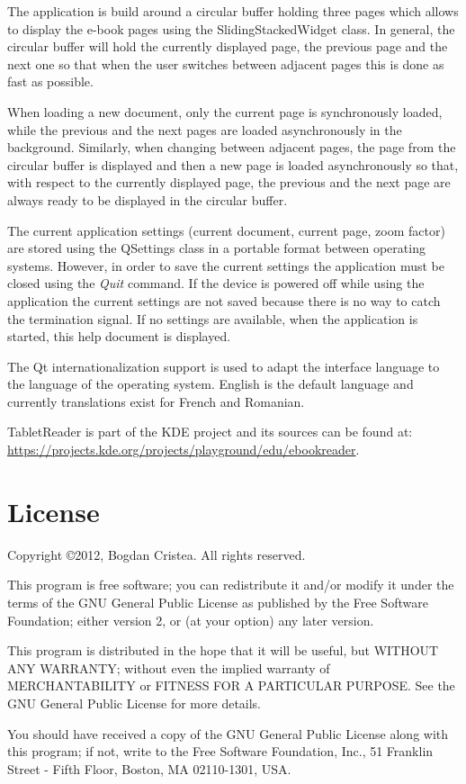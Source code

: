 \documentclass[journal,12pt]{IEEEtran}
\begin{document}
The application is build around a circular buffer holding three pages which allows to display the e-book pages using the \textrm{SlidingStackedWidget} class. In general, the circular buffer will hold the currently displayed page, the previous page and the next one so that when the user switches between adjacent pages this is done as fast as possible. 

When loading a new document, only the current page is synchronously loaded, while the previous and the next pages are loaded asynchronously in the background. Similarly, when changing between adjacent pages, the page from the circular buffer is displayed and then a new page is loaded asynchronously so that, with respect to the currently displayed page, the previous and the next page are always ready to be displayed in the circular buffer.

The current application settings (current document, current page, zoom factor) are stored using the \textrm{QSettings} class in a portable format between operating systems. However, in order to save the current settings the application must be closed using the \textit{Quit} command. If the device is powered off while using the application the current settings are not saved because there is no way to catch the termination signal. If no settings are available, when the application is started, this help document is displayed.

The Qt internationalization support is used to adapt the interface language to the language of the operating system. English is the default language and currently translations exist for French and Romanian.

TabletReader is part of the KDE project and its sources can be found at: \url{https://projects.kde.org/projects/playground/edu/ebookreader}.

\section{License}
 Copyright \copyright 2012, Bogdan Cristea. All rights reserved.
 
 This program is free software; you can redistribute it and/or modify  it under the terms of the GNU General Public License as published by  the Free Software Foundation; either version 2, or (at your option)  any later version.
 
 This program is distributed in the hope that it will be useful,  but WITHOUT ANY WARRANTY; without even the implied warranty of
 MERCHANTABILITY or FITNESS FOR A PARTICULAR PURPOSE.  See the  GNU General Public License for more details.
 
 You should have received a copy of the GNU General Public License along with this program; if not, write to the Free Software
 Foundation, Inc., 51 Franklin Street - Fifth Floor, Boston, MA 02110-1301, USA.
\end{document}
